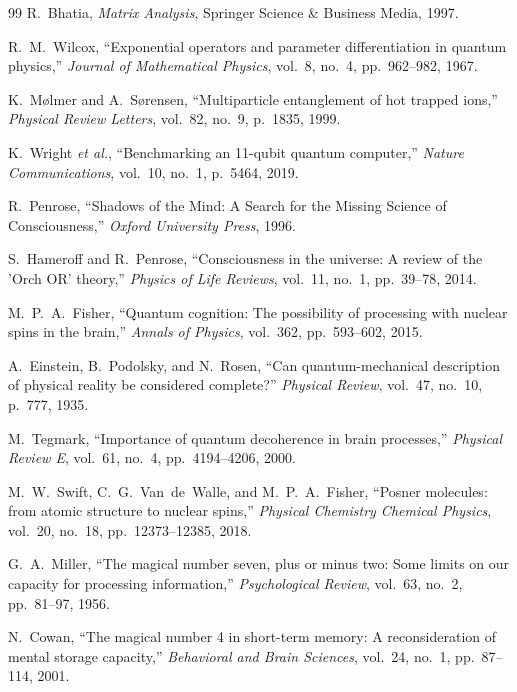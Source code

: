 \documentclass[10pt,twocolumn,3p]{article}
\begin{document}
\begin{thebibliography}{99}
R.~Bhatia,
\textit{Matrix Analysis},
Springer Science \& Business Media, 1997.

R.~M.~Wilcox,
``Exponential operators and parameter differentiation in quantum physics,''
\textit{Journal of Mathematical Physics}, vol.~8, no.~4, pp.~962--982, 1967.

K.~M\o lmer and A.~S\o rensen,
``Multiparticle entanglement of hot trapped ions,''
\textit{Physical Review Letters}, vol.~82, no.~9, p.~1835, 1999.

K.~Wright \textit{et al.},
``Benchmarking an 11-qubit quantum computer,''
\textit{Nature Communications}, vol.~10, no.~1, p.~5464, 2019.

R.~Penrose,
``Shadows of the Mind: A Search for the Missing Science of Consciousness,''
\textit{Oxford University Press}, 1996.

S.~Hameroff and R.~Penrose,
``Consciousness in the universe: A review of the 'Orch OR' theory,''
\textit{Physics of Life Reviews}, vol.~11, no.~1, pp.~39--78, 2014.

M.~P.~A.~Fisher,
``Quantum cognition: The possibility of processing with nuclear spins in the brain,''
\textit{Annals of Physics}, vol.~362, pp.~593--602, 2015.

A.~Einstein, B.~Podolsky, and N.~Rosen,
``Can quantum-mechanical description of physical reality be considered complete?''
\textit{Physical Review}, vol.~47, no.~10, p.~777, 1935.

M.~Tegmark,
``Importance of quantum decoherence in brain processes,''
\textit{Physical Review E}, vol.~61, no.~4, pp.~4194--4206, 2000.

M.~W.~Swift, C.~G.~Van~de~Walle, and M.~P.~A.~Fisher,
``Posner molecules: from atomic structure to nuclear spins,''
\textit{Physical Chemistry Chemical Physics}, vol.~20, no.~18, pp.~12373--12385, 2018.

G.~A.~Miller,
``The magical number seven, plus or minus two: Some limits on our capacity for processing information,''
\textit{Psychological Review}, vol.~63, no.~2, pp.~81--97, 1956.

N.~Cowan,
``The magical number 4 in short-term memory: A reconsideration of mental storage capacity,''
\textit{Behavioral and Brain Sciences}, vol.~24, no.~1, pp.~87--114, 2001.


\end{thebibliography}
\end{document}
